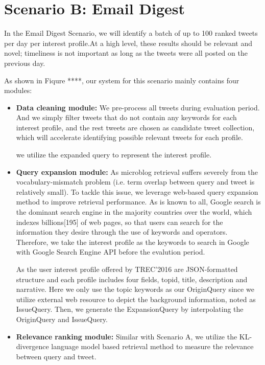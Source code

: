 \section{Scenario B: Email Digest}
In the Email Digest Scenario, we will identify a batch of up to 100 ranked tweets per day per interest profile.At a high level, these results should be relevant and novel; timeliness is not important as long as the tweets were all posted on the previous day.

As shown in Fiqure ****, our system for this scenario mainly contains four modules:

\begin{itemize}
\item \textbf{Data cleaning module:} We pre-process all tweets during evaluation period. And we simply filter tweets that do not contain any keywords for each interest profile, and the rest tweets are chosen as candidate tweet collection, which will accelerate identifying possible relevant tweets for each profile.

we utilize the expanded query to represent the interest profile.

\item \textbf{Query expansion module:} As microblog retrieval suffers severely from the
vocabulary-mismatch problem (i.e. term overlap between query and tweet is relatively small). To tackle this issue, we leverage web-based query expansion method to improve retrieval performance. As is known to all, Google search is the dominant search engine in the majority countries over the world, which indexes billions[195] of web pages, so that users can search for the information they desire through the use of keywords and operators. Therefore, we take the interest profile as the keywords to search in Google with Google Search Engine API before the evalution period.


As the user interest profile offered by TREC'2016 are JSON-formatted structure and each profile includes four fields, topid, title, description and narrative. Here we only use the topic keywords as our OriginQuery since we utilize external web resource to depict the background information, noted as IssueQuery. Then, we generate the ExpansionQuery by interpolating the OriginQuery and IssueQuery.

\item \textbf{Relevance ranking module:} Similar with Scenario A, we utilize the KL-divergence language model based retrieval method to measure the relevance between query and tweet.


\end{itemize}
